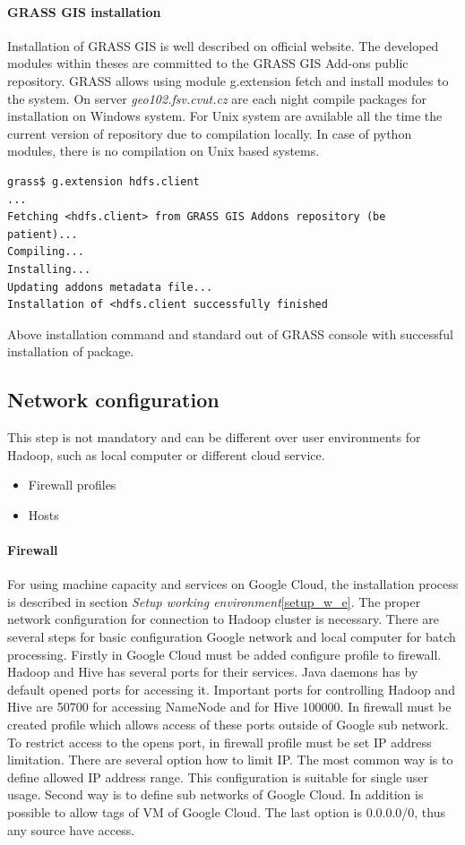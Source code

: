 \documentclass[a4paper,12pt,oneside]{report}
\begin{document}
\paragraph{GRASS GIS installation}
Installation of GRASS GIS is well described on official website. The developed modules within theses are committed to the GRASS GIS Add-ons public repository. GRASS allows using module g.extension fetch and install modules to the system. On server \textit{geo102.fsv.cvut.cz} are each night compile packages for installation on Windows system. For Unix system are available all the time the current version of repository due to compilation locally. In case of python modules, there is no compilation on Unix based systems. 
\begin{footnotesize}
\begin{lstlisting}[style=python]
grass$ g.extension hdfs.client
...
Fetching <hdfs.client> from GRASS GIS Addons repository (be patient)...
Compiling...
Installing...
Updating addons metadata file...
Installation of <hdfs.client successfully finished
\end{lstlisting}
\end{footnotesize}
Above installation command and standard out of GRASS console with successful installation of package. 



\subsection{Network configuration}
This step is not mandatory and can be different over user environments for  Hadoop, such as local computer or different cloud service.  
\begin{itemize}
\item Firewall profiles
\item Hosts
\end{itemize}


\paragraph{Firewall} For using machine capacity and services on Google Cloud,  the installation process is described in section \textit{Setup working environment}\ref{setup_w_e}. The proper network configuration for connection to Hadoop cluster is  necessary. There are several steps for basic configuration Google network and local computer for batch processing. Firstly in Google Cloud must be added configure profile to firewall. Hadoop and Hive has several ports for their services. Java daemons has by default opened ports for accessing it. Important ports for controlling Hadoop and Hive are 50700 for accessing NameNode and for Hive 100000. In firewall must be created profile which allows access of these ports outside of Google sub network. To restrict access to the opens port, in firewall profile must be set IP address limitation. There are several option how to limit IP. The most common way is to define allowed IP address range. This configuration is suitable for single user usage. Second way is to define sub networks of Google Cloud. In addition is possible to allow tags of VM of Google Cloud. The last option is  0.0.0.0/0, thus any source have access.
\end{document}
